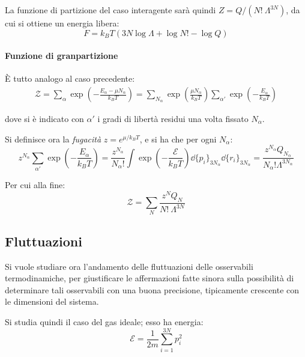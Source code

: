 La funzione di partizione del caso interagente sarà quindi $Z = Q / (N! ~\Lambda^{3N})$, da cui si ottiene un energia libera:
\begin{equation*}
	F =  k_B T (3N \log \Lambda + \log N! - \log Q)
\end{equation*}

\paragraph{Funzione di granpartizione} \`E tutto analogo al caso precedente:
\begin{align*}
	\mathcal{Z} = \sum_\alpha \exp \left(- \frac{E_\alpha - \mu N_\alpha}{k_B T}\right) = \sum_{N_\alpha} \exp \left( \frac{ \mu N_\alpha}{k_B T}\right) \sum_{\alpha'} \exp \left(- \frac{E_\alpha}{k_B T}\right) 
\end{align*}

\noindent dove si è indicato con $\alpha'$ i gradi di libertà residui una volta fissato $N_\alpha$.

Si definisce ora la \textit{fugacità} $z= e^{\mu/k_B T}$, e si ha che per ogni $N_\alpha$:
\begin{equation*}
	z^{N_\alpha} \sum_{\alpha'} \exp \left(- \frac{E_\alpha}{k_B T}\right) = \frac{z^{N_\alpha}}{N_\alpha !} \int \exp \left(- \frac{\mathcal{E}}{k_B T}\right) \dd \{p_i\}_{3N_\alpha} \dd \{r_i\}_{3N_\alpha} = \frac{z^{N_\alpha} Q_{N_\alpha}}{{N_\alpha ! \Lambda^{3N_\alpha}}}
\end{equation*}

Per cui alla fine:
\begin{equation*}
\mathcal{Z} = \sum_N \frac{z^{N} Q_{N}}{{N!~\Lambda^{3N}}}
\end{equation*}

\subsection{Fluttuazioni}
\label{sec:fluct}

Si vuole studiare ora l'andamento delle fluttuazioni delle osservabili termodinamiche, per giustificare le affermazioni fatte sinora sulla possibilità di determinare tali osservabili con una buona precisione, tipicamente crescente con le dimensioni del sistema.
\newline

Si studia quindi il caso del gas ideale; esso ha energia:
\begin{equation*}
	\mathcal{E} = \frac{1}{2m} \sum_{i =1}^{3N} p_i^2
\end{equation*}


